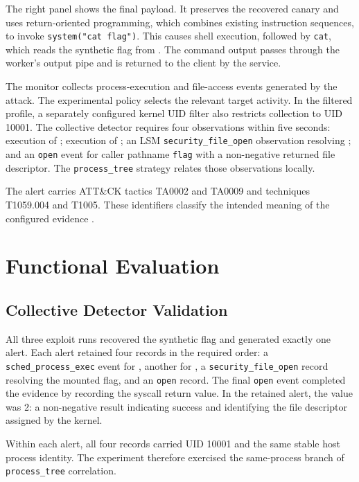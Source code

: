 The right panel shows the final payload. It preserves the recovered canary
and uses return-oriented programming, which combines existing instruction
sequences, to invoke \texttt{system("cat flag")}. This causes shell execution,
followed by \texttt{cat}, which reads the synthetic flag from
. The command output passes through the worker's
output pipe and is returned to the client by the service.

The monitor collects process-execution and file-access events generated by
the attack. The experimental policy selects the relevant target activity.
In the filtered profile, a separately configured kernel UID filter also
restricts collection to UID 10001. The collective detector requires four observations
within five seconds: execution of ; execution of
; an LSM \texttt{security\_file\_open} observation resolving
; and an \texttt{open} event for caller pathname
\texttt{flag} with a non-negative returned file descriptor. The
\texttt{process\_tree} strategy relates those observations locally.

The alert carries ATT\&CK tactics TA0002 and TA0009 and techniques T1059.004
and T1005. These identifiers classify the intended meaning of the configured
evidence \cite{strom2020attack}.

\section{Functional Evaluation}
\label{sec:evaluation-functional}

\subsection{Collective Detector Validation}
\label{subsec:evaluation-collective-detector}

All three exploit runs recovered the synthetic flag and generated exactly one
alert. Each alert retained four records in the required order: a
\texttt{sched\_process\_}\allowbreak\texttt{exec} event for , another for
, a \texttt{security\_file\_open} record resolving the mounted
flag, and an \texttt{open} record. The final \texttt{open} event completed the 
evidence by recording the syscall return value. In the retained alert, the value was 
2: a non-negative result indicating success and identifying the file descriptor assigned by the kernel.

Within each alert, all four records carried UID 10001 and the same stable host
process identity. The experiment therefore exercised the same-process branch
of \texttt{process\_tree} correlation.

